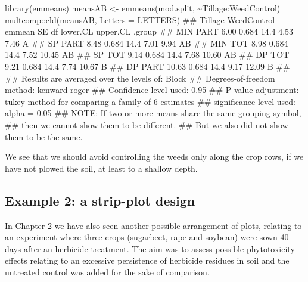 \documentclass[a4paper,12pt,oneside]{book}
\newenvironment{Shaded}{\begin{snugshade}}{\end{snugshade}}
\newcommand{\SpecialCharTok}[1]{#1}
\newcommand{\DocumentationTok}[1]{#1}
\newcommand{\OtherTok}[1]{#1}
\newcommand{\FunctionTok}[1]{#1}
\newcommand{\AttributeTok}[1]{#1}
\newcommand{\AlertTok}[1]{#1}
\newcommand{\NormalTok}[1]{#1}
\begin{document}
\begin{Shaded}
\begin{Highlighting}[]
\FunctionTok{library}\NormalTok{(emmeans)}
\NormalTok{meansAB }\OtherTok{\textless{}{-}} \FunctionTok{emmeans}\NormalTok{(mod.split, }\SpecialCharTok{\textasciitilde{}}\NormalTok{Tillage}\SpecialCharTok{:}\NormalTok{WeedControl)}
\NormalTok{multcomp}\SpecialCharTok{::}\FunctionTok{cld}\NormalTok{(meansAB, }\AttributeTok{Letters =}\NormalTok{ LETTERS)}
\DocumentationTok{\#\#  Tillage WeedControl emmean    SE   df lower.CL upper.CL .group}
\DocumentationTok{\#\#  MIN     PART          6.00 0.684 14.4     4.53     7.46  A    }
\DocumentationTok{\#\#  SP      PART          8.48 0.684 14.4     7.01     9.94  AB   }
\DocumentationTok{\#\#  MIN     TOT           8.98 0.684 14.4     7.52    10.45  AB   }
\DocumentationTok{\#\#  SP      TOT           9.14 0.684 14.4     7.68    10.60  AB   }
\DocumentationTok{\#\#  DP      TOT           9.21 0.684 14.4     7.74    10.67   B   }
\DocumentationTok{\#\#  DP      PART         10.63 0.684 14.4     9.17    12.09   B   }
\DocumentationTok{\#\# }
\DocumentationTok{\#\# Results are averaged over the levels of: Block }
\DocumentationTok{\#\# Degrees{-}of{-}freedom method: kenward{-}roger }
\DocumentationTok{\#\# Confidence level used: 0.95 }
\DocumentationTok{\#\# P value adjustment: tukey method for comparing a family of 6 estimates }
\DocumentationTok{\#\# significance level used: alpha = 0.05 }
\DocumentationTok{\#\# }\AlertTok{NOTE}\DocumentationTok{: If two or more means share the same grouping symbol,}
\DocumentationTok{\#\#       then we cannot show them to be different.}
\DocumentationTok{\#\#       But we also did not show them to be the same.}
\end{Highlighting}
\end{Shaded}

We see that we should avoid controlling the weeds only along the crop rows, if we have not plowed the soil, at least to a shallow depth.

\hypertarget{example-2-a-strip-plot-design}{%
\subsection{Example 2: a strip-plot design}\label{example-2-a-strip-plot-design}}

In Chapter 2 we have also seen another possible arrangement of plots, relating to an experiment where three crops (sugarbeet, rape and soybean) were sown 40 days after an herbicide treatment. The aim was to assess possible phytotoxicity effects relating to an excessive persistence of herbicide residues in soil and the untreated control was added for the sake of comparison.
\end{document}
